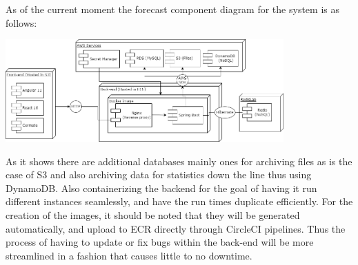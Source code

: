 As of the current moment the forecast component diagram for the system is as follows:

\begin{center}
    \includegraphics[width=0.8\textwidth]{images/forecast}
\end{center}

As it shows there are additional databases mainly ones for archiving files as is the case of
S3 and also archiving data for statistics down the line thus using DynamoDB\@.
Also containerizing the backend for the goal of having it run different instances seamlessly,
and have the run times duplicate efficiently.
For the creation of the images, it should be noted that they will be generated automatically,
and upload to ECR directly through CircleCI pipelines.
Thus the process of having to update or fix bugs within the back-end will be more streamlined
in a fashion that causes little to no downtime.
